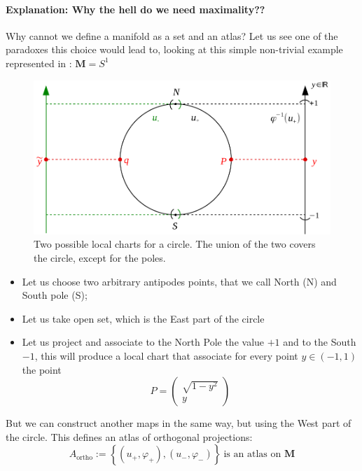 \documentclass[../main.tex]{subfiles}
\begin{document}
\paragraph{Explanation: Why the hell do we need maximality??}
Why cannot we define a manifold as a set and an atlas? Let us see one of the paradoxes this choice would lead to, looking at this simple non-trivial example represented in : $\mathbf{M}=S^1$
\begin{figure}[H]
	\includegraphics{images/paradox_maximality.pdf}
	\caption[Mapping a circle]{Two possible local charts for a circle. The union of the two covers the circle, except for the poles.}
\end{figure} 
\begin{itemize}
    \item Let us choose two arbitrary antipodes points, that we call North (N) and South pole (S);
    \item Let us take open set, which is the East part of the circle
    \item Let us project and associate to the North Pole the value $+1$ and to the South $-1$, this will produce a local chart that associate for every point $y \in (-1,1)$ the point
    \[
    P =
    \begin{pmatrix}
    \sqrt{1-y^2}\\
    y
    \end{pmatrix}
    \]
\end{itemize}
But we can construct another maps in the same way, but using the West part of the circle. This defines an atlas of orthogonal projections:
\[
A_{\textrm{ortho}}:=\left\{\left(u_+,\varphi_+\right), \left(u_-,\varphi_-\right)\right\} \ \textrm{is an atlas on } \mathbf{M}
\]
\end{document}
